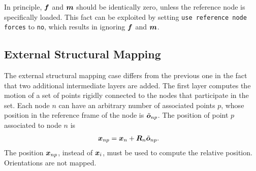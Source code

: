 In principle, $\bm{f}$ and $\bm{m}$ should be identically zero,
unless the reference node is specifically loaded.
This fact can be exploited by setting \texttt{use reference node forces}
to \texttt{no}, which results in ignoring $\bm{f}$ and $\bm{m}$.



\subsection{External Structural Mapping}
The external structural mapping case differs from the previous one
in the fact that two additional intermediate layers are added.
The first layer computes the motion of a set of points
rigidly connected to the nodes that participate in the set.
Each node $n$ can have an arbitrary number of associated points $p$,
whose position in the reference frame of the node is $\tilde{\bm{o}}_{np}$.
The position of point $p$ associated to node $n$ is
\begin{align}
	\bm{x}_{np}
	&=
	\bm{x}_n
	+
	\bm{R}_n \tilde{\bm{o}}_{np}
	\label{eq:forces:external-mapping:x_np}
	.
\end{align}
The position $\bm{x}_{np}$, instead of $\bm{x}_i$, must be used to compute
the relative position.
Orientations are not mapped.

